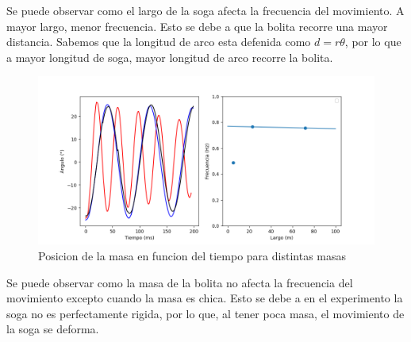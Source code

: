 \documentclass[12pt,a4]{article}
\begin{document}
Se puede observar como el largo de la soga afecta la frecuencia del movimiento. A mayor largo, menor frecuencia. Esto se debe a que la bolita recorre una mayor distancia. Sabemos que la longitud de arco esta defenida como $d = r \theta$, por lo que a mayor longitud de soga, mayor longitud de arco recorre la bolita.

\begin{figure}[H]
    \centering
    \includegraphics[width=0.6\linewidth]{peso.png}
    \caption{Posicion de la masa en funcion del tiempo para distintas masas}
    \label{fig:masa}
\end{figure}

Se puede observar como la masa de la bolita no afecta la frecuencia del movimiento excepto cuando la masa es chica. Esto se debe a en el experimento la soga no es perfectamente rigida, por lo que, al tener poca masa, el movimiento de la soga se deforma.
\end{document}
